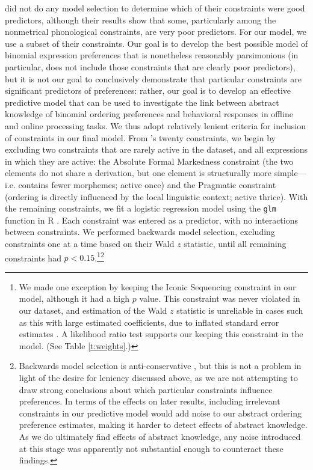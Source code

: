 \documentclass[authoryear]{elsarticle}
\begin{document}
\citeauthor{Benor:2006gv} did not do any model selection to determine which of their constraints were good predictors, although their results show that some, particularly among the nonmetrical phonological constraints, are very poor predictors. For our model, we use a subset of their constraints. Our goal is to develop the best possible model of binomial expression preferences that is nonetheless reasonably parsimonious (in particular, does not include those constraints that are clearly poor predictors), but it is not our goal to conclusively demonstrate that particular constraints are significant predictors of preferences: rather, our goal is to develop an effective predictive model that can be used to investigate the link between abstract knowledge of binomial ordering preferences and behavioral responses in offline and online processing tasks. We thus adopt relatively lenient criteria for inclusion of constraints in our final model. From \citeauthor{Benor:2006gv}'s twenty constraints, we begin by excluding two constraints that are rarely active in the dataset, and all expressions in which they are active: the Absolute Formal Markedness constraint (the two elements do not share a derivation, but one element is structurally more simple---i.e. contains fewer morphemes; active once) and the Pragmatic constraint (ordering is directly influenced by the local linguistic context; active thrice). With the remaining constraints, we fit a logistic regression model using the {\tt glm} function in R \citep{RCoreTeam:2014wf}. Each constraint was entered as a predictor, with no interactions between constraints. We performed backwards model selection, excluding constraints one at a time based on their Wald $z$ statistic, until all remaining constraints had $p < 0.15$.\footnote{\label{waldz}We made one exception by keeping the Iconic Sequencing constraint in our model, although it had a high $p$ value. This constraint was never violated in our dataset, and estimation of the Wald $z$ statistic is unreliable in cases such as this with large estimated coefficients, due to inflated standard error estimates \citep{Agresti:2002vi,Menard:2002tc}. A likelihood ratio test supports our keeping this constraint in the model. (See Table \ref{t:weights}.)}\footnote{Backwards model selection is anti-conservative \citep{Harrell:2001jr}, but this is not a problem in light of the desire for leniency discussed above, as we are not attempting to draw strong conclusions about which particular constraints influence preferences. In terms of the effects on later results, including irrelevant constraints in our predictive model would add noise to our abstract ordering preference estimates, making it harder to detect effects of abstract knowledge. As we do ultimately find effects of abstract knowledge, any noise introduced at this stage was apparently not substantial enough to counteract these findings.}
\end{document}
